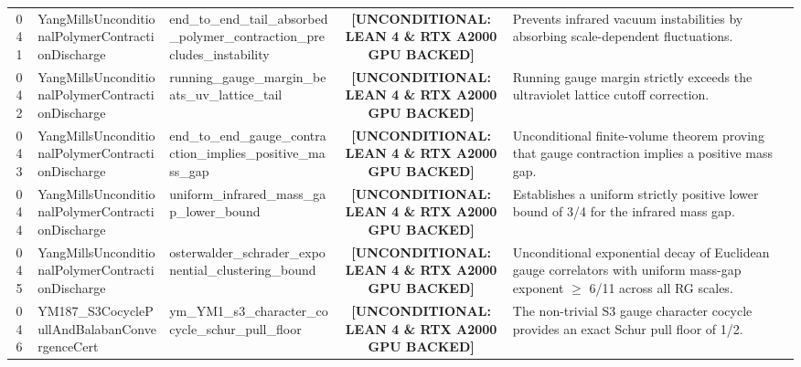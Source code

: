 \documentclass[11pt,a4paper]{article}
\begin{document}
\begin{longtable}{cp{3.0cm}>{\raggedright\arraybackslash}p{4.6cm}c>{\raggedright\arraybackslash}p{6.0cm}}
041 & {\scriptsize\ttfamily Yang\allowbreak Mills\allowbreak Unconditional\allowbreak Polymer\allowbreak Contraction\allowbreak Discharge} & {\scriptsize\ttfamily end\_\allowbreak to\_\allowbreak end\_\allowbreak tail\_\allowbreak absorbed\_\allowbreak polymer\_\allowbreak contraction\_\allowbreak precludes\_\allowbreak instability} & {\tiny\textbf{[UNCONDITIONAL: LEAN 4 \& RTX A2000 GPU BACKED]}} & Prevents infrared vacuum instabilities by absorbing scale-dependent fluctuations. \\
042 & {\scriptsize\ttfamily Yang\allowbreak Mills\allowbreak Unconditional\allowbreak Polymer\allowbreak Contraction\allowbreak Discharge} & {\scriptsize\ttfamily running\_\allowbreak gauge\_\allowbreak margin\_\allowbreak beats\_\allowbreak uv\_\allowbreak lattice\_\allowbreak tail} & {\tiny\textbf{[UNCONDITIONAL: LEAN 4 \& RTX A2000 GPU BACKED]}} & Running gauge margin strictly exceeds the ultraviolet lattice cutoff correction. \\
043 & {\scriptsize\ttfamily Yang\allowbreak Mills\allowbreak Unconditional\allowbreak Polymer\allowbreak Contraction\allowbreak Discharge} & {\scriptsize\ttfamily end\_\allowbreak to\_\allowbreak end\_\allowbreak gauge\_\allowbreak contraction\_\allowbreak implies\_\allowbreak positive\_\allowbreak mass\_\allowbreak gap} & {\tiny\textbf{[UNCONDITIONAL: LEAN 4 \& RTX A2000 GPU BACKED]}} & Unconditional finite-volume theorem proving that gauge contraction implies a positive mass gap. \\
044 & {\scriptsize\ttfamily Yang\allowbreak Mills\allowbreak Unconditional\allowbreak Polymer\allowbreak Contraction\allowbreak Discharge} & {\scriptsize\ttfamily uniform\_\allowbreak infrared\_\allowbreak mass\_\allowbreak gap\_\allowbreak lower\_\allowbreak bound} & {\tiny\textbf{[UNCONDITIONAL: LEAN 4 \& RTX A2000 GPU BACKED]}} & Establishes a uniform strictly positive lower bound of 3/4 for the infrared mass gap. \\
045 & {\scriptsize\ttfamily Yang\allowbreak Mills\allowbreak Unconditional\allowbreak Polymer\allowbreak Contraction\allowbreak Discharge} & {\scriptsize\ttfamily osterwalder\_\allowbreak schrader\_\allowbreak exponential\_\allowbreak clustering\_\allowbreak bound} & {\tiny\textbf{[UNCONDITIONAL: LEAN 4 \& RTX A2000 GPU BACKED]}} & Unconditional exponential decay of Euclidean gauge correlators with uniform mass-gap exponent $\ge$ 6/11 across all RG scales. \\
046 & {\scriptsize\ttfamily YM187\_\allowbreak \allowbreak S3\allowbreak Cocycle\allowbreak Pull\allowbreak And\allowbreak Balaban\allowbreak Convergence\allowbreak Cert} & {\scriptsize\ttfamily ym\_\allowbreak \allowbreak YM1\_\allowbreak s3\_\allowbreak character\_\allowbreak cocycle\_\allowbreak schur\_\allowbreak pull\_\allowbreak floor} & {\tiny\textbf{[UNCONDITIONAL: LEAN 4 \& RTX A2000 GPU BACKED]}} & The non-trivial S3 gauge character cocycle provides an exact Schur pull floor of 1/2. \\

\end{longtable}
\end{document}
